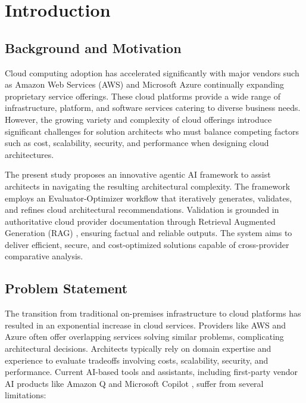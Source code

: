 \chapter{Introduction}

\section{Background and Motivation}

Cloud computing adoption has accelerated significantly with major vendors such as Amazon Web Services (AWS) and Microsoft Azure continually expanding proprietary service offerings. These cloud platforms provide a wide range of infrastructure, platform, and software services catering to diverse business needs. However, the growing variety and complexity of cloud offerings introduce significant challenges for solution architects who must balance competing factors such as cost, scalability, security, and performance when designing cloud architectures. %

The present study proposes an innovative agentic AI framework to assist architects in navigating the resulting architectural complexity. The framework employs an Evaluator-Optimizer workflow \cite{anthropic2024agents} that iteratively generates, validates, and refines cloud architectural recommendations. Validation is grounded in authoritative cloud provider documentation through Retrieval Augmented Generation (RAG) \cite{lewis2020rag, asai2023selfrag}, ensuring factual and reliable outputs. The system aims to deliver efficient, secure, and cost-optimized solutions capable of cross-provider comparative analysis. %

\section{Problem Statement}

The transition from traditional on-premises infrastructure to cloud platforms has resulted in an exponential increase in cloud services. Providers like AWS and Azure often offer overlapping services solving similar problems, complicating architectural decisions. %
Architects typically rely on domain expertise and experience to evaluate tradeoffs involving costs, scalability, security, and performance. Current AI-based tools and assistants, including first-party vendor AI products like Amazon Q \cite{aws2023q} and Microsoft Copilot \cite{microsoft2024copilot}, suffer from several limitations:

